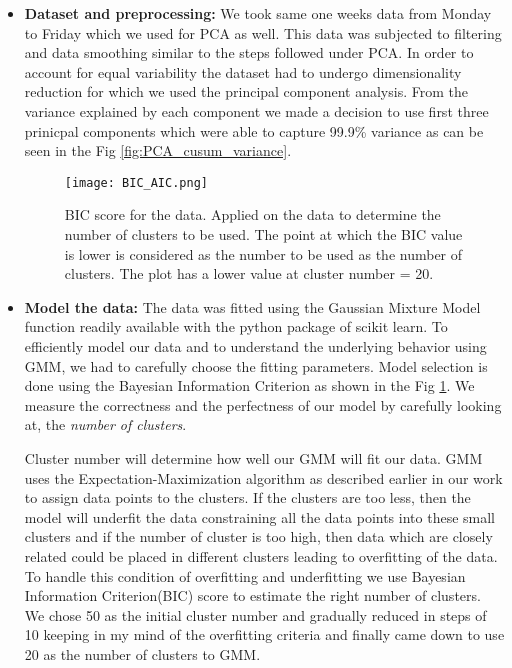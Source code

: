 \begin{itemize}
\item\textbf{Dataset and preprocessing:} We took same one weeks data from Monday to Friday which we used for PCA as well. This data was subjected to filtering and data smoothing similar to the steps followed under PCA. In order to account for equal variability the dataset had to undergo dimensionality reduction for which we used the principal component analysis. From the variance explained by each component we made a decision to use first three prinicpal components which were able to capture 99.9\% variance as can be seen in the Fig \ref{fig:PCA_cusum_variance}.

\begin{figure}
\centerline{\texttt{[image: BIC\_AIC.png]}}
    \caption{BIC score for the data. Applied on the data to determine the number of clusters to be used. The point at which the BIC value is lower is considered as the number to be used as the number of clusters. The plot has a lower value at cluster number = 20. }
    \label{fig:bic}
\end{figure}

\item\textbf{Model the data:} The data was fitted using the Gaussian Mixture Model function readily available with the python package of scikit learn. To efficiently model our data and to understand the underlying behavior using GMM, we had to carefully choose the fitting parameters. Model selection is done using the Bayesian Information Criterion as shown in the Fig \ref{fig:bic}.  We measure the correctness and the perfectness of our model by carefully looking at,  the \textit{number of clusters}. 

Cluster number will determine how well our GMM will fit our data. GMM uses the Expectation-Maximization algorithm as described earlier in our work to assign data points to the clusters. If the clusters are too less, then the model will underfit the data constraining all the data points into these small clusters and if the number of cluster is too high, then data which are closely related could be placed in different clusters leading to overfitting of the data. To handle this condition of overfitting and underfitting we use Bayesian Information Criterion(BIC) score to estimate the right number of clusters. We chose 50 as the initial cluster number and gradually reduced in steps of 10 keeping in my mind of the overfitting criteria and finally came down to use 20 as the number of clusters to GMM.


\end{itemize}
